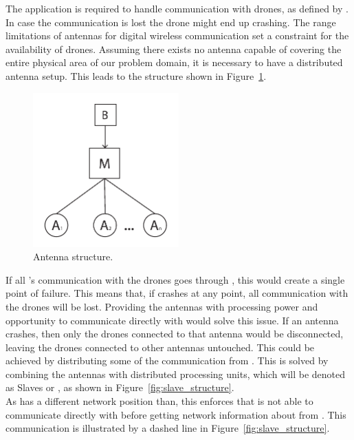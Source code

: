 The application is required to handle communication with drones, as defined by .
In case the communication is lost the drone might end up crashing.
The range limitations of antennas for digital wireless communication set a constraint for the availability of drones.
Assuming there exists no antenna capable of covering the entire physical area of our problem domain, it is necessary to have a distributed antenna setup. 
This leads to the structure shown in Figure~\ref{fig:antenna_structure}.

\begin{figure}[htb]
    \centering
    \includegraphics[width=0.5\textwidth]{gfx/antenna_structure.pdf}
    \caption{Antenna structure.}
    \label{fig:antenna_structure}
\end{figure}

If all 's communication with the drones goes through , this would create a single point of failure.
This means that, if  crashes at any point, all communication with the drones will be lost.
Providing the antennas with processing power and opportunity to communicate directly with  would solve this issue.
If an antenna crashes, then only the drones connected to that antenna would be disconnected, leaving the drones connected to other antennas untouched.
This could be achieved by distributing some of the communication from .
This is solved by combining the antennas with distributed processing units, which will be denoted as Slaves or , as shown in Figure~\ref{fig:slave_structure}. \\

As  has a different network position than, this enforces that  is not able to communicate directly with  before getting network information about  from . This communication is illustrated by a dashed line in Figure~\ref{fig:slave_structure}. \\

